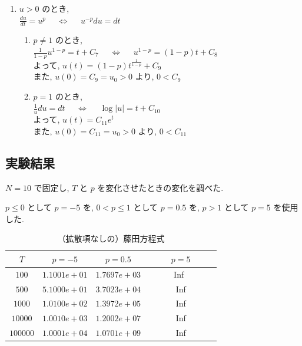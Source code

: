 \documentclass[11pt]{jsarticle}
\begin{document}
\begin{enumerate}
\item $u > 0 $ のとき, \\
$\displaystyle \frac{du}{dt} = u^{p}$ \ \ $\Leftrightarrow$ \ \ $u^{-p} du = dt$ \\
\begin{enumerate}
\item $p \neq 1$ のとき, \\
$\displaystyle \frac{1}{1-p}u^{1-p} = t + C_{7}$ \ \ $\Leftrightarrow$ \ \ $u^{1-p} = (1-p)t + C_{8}$ \\
よって, $\displaystyle u(t) = (1-p)t^{\frac{1}{1-p}} + C_{9}$ \\
また, $u(0) = C_{9} = u_{0} > 0$ より, $0 < C_{9}$ \\
\item $p = 1$ のとき, \\
$\displaystyle \frac{1}{u}du = dt$ \ \ $\Leftrightarrow$  \ \ $\log{|u|} = t + C_{10}$ \\
よって, $\displaystyle u(t) = C_{11}e^{t}$ \\
また, $u(0) = C_{11} = u_{0} > 0$ より, $0 < C_{11}$ \\
\end{enumerate}

\end{enumerate}



\subsection{実験結果}
$N = 10$ で固定し, $T$ と $p$ を変化させたときの変化を調べた.\par
$p\leq 0$ として $p = -5$ を, $0<p\leq1$ として $p = 0.5$ を, $p>1$ として $p = 5$ を使用した. 
\begin{table}[htbp]
\centering
\begin{tabular}{|c||c|c|c|} \hline
\textbf{$T$} & \textbf{$p = -5$} & \textbf{$p = 0.5$} & \textbf{$p = 5$} \\ \hline\hline
$100$ & $1.1001e+01$ & $1.7697e+03$ & \ \ \ \ \ \ Inf\ \ \ \ \ \ \ \\ \hline
$500$ & $5.1000e+01$ & $3.7023e+04$ & Inf \\ \hline
$1000$ & $1.0100e+02$ & $1.3972e+05$ & Inf \\ \hline
$10000$ & $1.0010e+03$ & $1.2002e+07$ & Inf \\ \hline
$100000$ & $1.0001e+04$ & $1.0701e+09$ & Inf \\ \hline
\end{tabular}
\caption{（拡散項なしの）藤田方程式}
\end{table}
\clearpage
\end{document}
